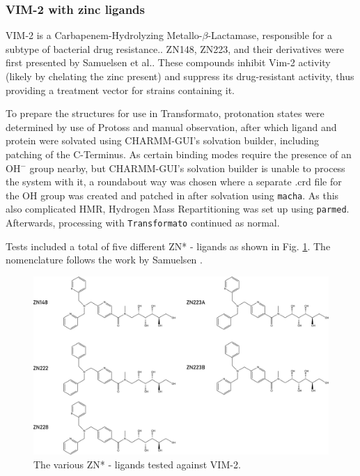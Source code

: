 \documentclass[oneside]{scrreprt}
\begin{document}
\subsubsection{VIM-2 with zinc ligands}

VIM-2 is a Carbapenem-Hydrolyzing Metallo-$\beta$-Lactamase, responsible for a subtype of bacterial drug resistance.\cite{Poirel2000Apr}. ZN148, ZN223, and their derivatives were first presented by Samuelsen et al.\cite{Samuelsen2020Jun}. These compounds inhibit Vim-2 activity (likely by chelating the zinc present) and suppress its drug-resistant activity, thus providing a treatment vector for strains containing it. 

To prepare the structures for use in Transformato, protonation states were determined by use of Protoss\cite{Lippert2009Dec,Bietz2014Dec} and manual observation, after which ligand and protein were solvated using CHARMM-GUI's solvation builder\cite{Jo2008Aug}, including patching of the C-Terminus. As certain binding modes require the presence of an OH$^-$ group nearby, but CHARMM-GUI's solvation builder is unable to process the system with it, a roundabout way was chosen where a separate .crd file for the OH group was created and patched in after solvation using \texttt{macha}\cite{twotoneblue2022May}. As this also complicated HMR, Hydrogen Mass Repartitioning was set up using \texttt{parmed}\cite{Shirts2016Sep}. Afterwards, processing with \texttt{Transformato} continued as normal.

Tests included a total of five different ZN* - ligands as shown in Fig. \ref{fig:strucs_vim2}. The nomenclature follows the work by Samuelsen \cite{Samuelsen2020Jun}.

\begin{figure}
    \centering
    \includegraphics[width=1\textwidth]{strucs/vim2strucs.png}
    \caption[The various ZN* - ligands bound to VIM-2] {The various ZN* - ligands tested against VIM-2.}
    \label{fig:strucs_vim2}
\end{figure}
\end{document}
